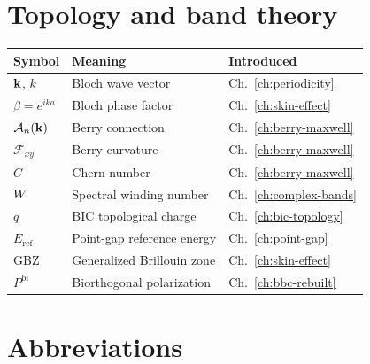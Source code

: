 \section{Topology and band theory}
\label{sec:topology-symbols}

\begin{center}
\begin{tabular}{lll}
\toprule
Symbol & Meaning & Introduced \\
\midrule
$\mathbf{k}$, $k$ & Bloch wave vector & Ch.~\ref{ch:periodicity} \\
$\beta = e^{ik a}$ & Bloch phase factor & Ch.~\ref{ch:skin-effect} \\
$\mathcal{A}_n(\mathbf{k})$ & Berry connection & Ch.~\ref{ch:berry-maxwell} \\
$\mathcal{F}_{xy}$ & Berry curvature & Ch.~\ref{ch:berry-maxwell} \\
$C$ & Chern number & Ch.~\ref{ch:berry-maxwell} \\
$W$ & Spectral winding number & Ch.~\ref{ch:complex-bands} \\
$q$ & BIC topological charge & Ch.~\ref{ch:bic-topology} \\
$E_{\mathrm{ref}}$ & Point-gap reference energy & Ch.~\ref{ch:point-gap} \\
GBZ & Generalized Brillouin zone & Ch.~\ref{ch:skin-effect} \\
$P^{\mathrm{bi}}$ & Biorthogonal polarization & Ch.~\ref{ch:bbc-rebuilt} \\
\bottomrule
\end{tabular}
\end{center}


\section{Abbreviations}
\label{sec:abbreviations}

